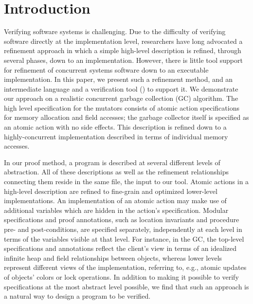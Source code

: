 \section{Introduction}
\label{sec:introduction}

Verifying software systems is challenging.
Due to the difficulty of verifying software directly at the implementation level,
researchers have long advocated a refinement approach in which a simple high-level description is refined, 
through several phases, down to an implementation.
However, there is little tool support for refinement of concurrent systems software down to an executable implementation.
In this paper, we present such a refinement method, and an intermediate language and a verification tool (\civl) to support it.
We demonstrate our approach on a realistic concurrent garbage collection (GC) algorithm.
The high level specification for the mutators consists of atomic action specifications for memory allocation and field accesses;
the garbage collector itself is specified as an atomic action with no side effects.
This description is refined down to a highly-concurrent implementation described in terms of individual memory accesses.

In our proof method, a program is described at several different levels of abstraction. 
All of these descriptions as well as the refinement relationships connecting them reside in the same \civl file, the input to our tool. 
Atomic actions in a high-level description are refined to fine-grain and optimized lower-level implementations. 
An implementation of an atomic action may make use of additional variables which are hidden in the action's specification. 
Modular specifications and proof annotations, such as location invariants and procedure pre- and post-conditions, 
are specified separately, independently at each level in terms of the variables visible at that level. 
For instance, in the GC, the top-level specifications and annotations reflect the client's view 
in terms of an idealized infinite heap and field relationships between objects, 
whereas lower levels represent different views of the implementation, referring to, 
e.g., atomic updates of objects' colors or lock operations.
In addition to making it possible to verify specifications at the most abstract level possible, 
we find that such an approach is a natural way to design a program to be verified.  

